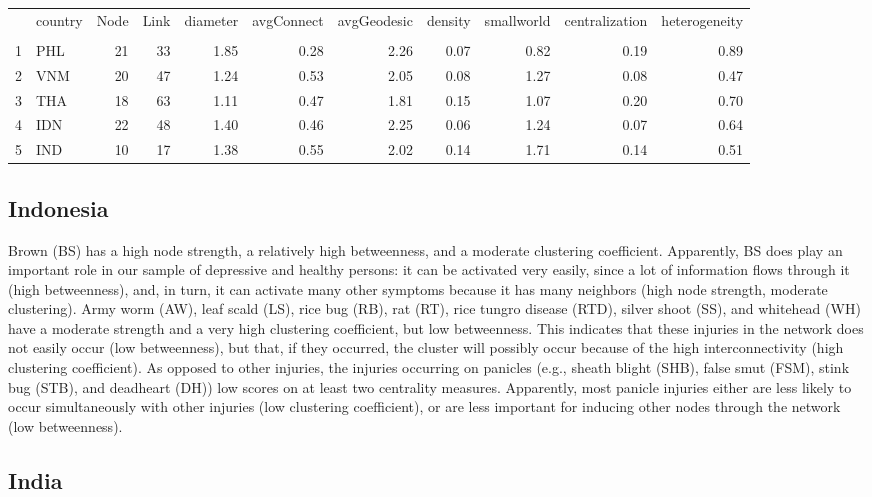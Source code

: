 \documentclass{frontiersSCNS} %
\begin{document}
\begin{table}[ht]
\centering
\begin{tabular}{rlrrrrrrrrr}
  \hline
 & country & Node & Link & diameter & avgConnect & avgGeodesic & density & smallworld & centralization & heterogeneity \\ 
 \\
  \hline
1 & PHL &  21 & 33 & 1.85 & 0.28 & 2.26 & 0.07 & 0.82 & 0.19 & 0.89 \\ 
  2 & VNM &  20 & 47 & 1.24 & 0.53 & 2.05 & 0.08 & 1.27 & 0.08 & 0.47 \\ 
  3 & THA &  18 & 63 & 1.11 & 0.47 & 1.81 & 0.15 & 1.07 & 0.20 & 0.70 \\ 
  4 & IDN &  22 & 48 & 1.40 & 0.46 & 2.25 & 0.06 & 1.24 & 0.07 & 0.64 \\ 
  5 & IND &  10 & 17 & 1.38 & 0.55 & 2.02 & 0.14 & 1.71 & 0.14 & 0.51 \\ 
   \hline
\end{tabular}
\end{table}

\subsection{Indonesia}
Brown (BS) has a high node strength, a relatively high betweenness, and a moderate clustering coefficient. Apparently, BS does play an important role in our sample of depressive and healthy persons: it can be activated very easily, since a lot of information flows through it (high betweenness), and, in turn, it can activate  many other symptoms because it has many neighbors (high node strength, moderate clustering). Army worm (AW), leaf scald (LS), rice bug (RB), rat (RT), rice tungro disease (RTD), silver shoot (SS), and whitehead (WH)  have a moderate strength and a very high clustering coefficient, but low betweenness. This indicates that these injuries in the network does not easily occur (low betweenness), but that, if they occurred, the cluster will possibly occur because of the high interconnectivity (high clustering coefficient). As opposed to other injuries, the injuries occurring on panicles (e.g., sheath blight (SHB), false smut (FSM), stink bug (STB), and deadheart (DH))  low scores on at least two centrality measures.  Apparently, most panicle injuries either are less likely to occur simultaneously with other injuries (low clustering coefficient), or are less important for inducing other nodes through the network (low betweenness).

\subsection{India}
\end{document}
